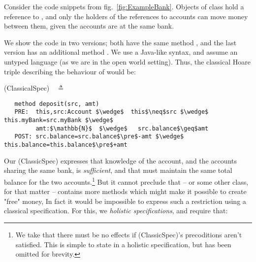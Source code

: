 Consider the code snippets from fig.~\ref{fig:ExampleBank}. Objects of
 class  hold a reference to , and only the holders of the references to accounts can move money between them, given the accounts are at the same bank.

 We show the code in two versions; both have the same method , and the last version 
 has an additional method .
  We use a Java-like syntax, and assume an untyped language (as we are in the open world setting).
 Thus, the classical Hoare triple describing the behaviour of  would be:
 
 \vspace{0.1in}
(ClassicalSpec)\ \  $\triangleq$\\ 
\vspace{-0.22in}
\begin{lstlisting}
   method deposit(src, amt)
   PRE:  this,src:Account $\wedge$  this$\neq$src $\wedge$ this.myBank=src.myBank $\wedge$ 
         amt:$\mathbb{N}$  $\wedge$   src.balance$\geq$amt
   POST: src.balance=src.balance$\pre$-amt $\wedge$ this.balance=this.balance$\pre$+amt
\end{lstlisting}
\vspace{-0.1in}

Our (ClassicSpec) expresses that knowledge of the  account, and the accounts sharing the same bank, is \emph{sufficient}, %
and that  %
%
  must maintain the same total balance for the two accounts.\footnote{We take that there must be no effects if (ClassicSpec)'s precoditions aren't satisfied. This is simple to state in a holistic specification, but has been omitted for brevity.}
%
But it cannot preclude that  -- or some other class, for that matter -- contains more methods 
which might make it possible to create "free" money,  In fact it would be impossible to express such a restriction using a classical specification. For this, we  \emph{holistic specifications}, and require that:
 

